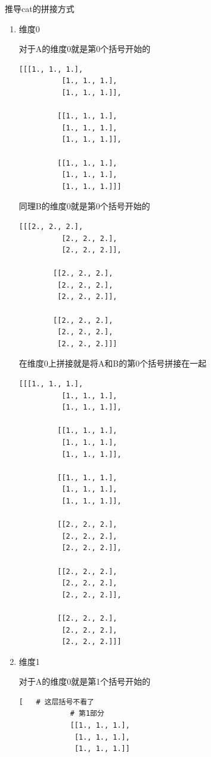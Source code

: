 \begin{derivation}{推导cat的拼接方式}
    \begin{enumerate}[label=\arabic*)]
        \item 维度0 

        对于A的维度0就是第0个括号开始的
        \begin{lstlisting}[style=demostyle,numbers=none]
        [[[1., 1., 1.],
          [1., 1., 1.],
          [1., 1., 1.]],

         [[1., 1., 1.],
          [1., 1., 1.],
          [1., 1., 1.]],

         [[1., 1., 1.],
          [1., 1., 1.],
          [1., 1., 1.]]]
        \end{lstlisting}   
        
        同理B的维度0就是第0个括号开始的
        \begin{lstlisting}[style=demostyle,numbers=none]
        [[[2., 2., 2.],
          [2., 2., 2.],
          [2., 2., 2.]],

        [[2., 2., 2.],
         [2., 2., 2.],
         [2., 2., 2.]],

        [[2., 2., 2.],
         [2., 2., 2.],
         [2., 2., 2.]]]
        \end{lstlisting}

        在维度0上拼接就是将A和B的第0个括号拼接在一起
        \begin{lstlisting}[style=demostyle,numbers=none]
        [[[1., 1., 1.],
          [1., 1., 1.],
          [1., 1., 1.]],

         [[1., 1., 1.],
          [1., 1., 1.],
          [1., 1., 1.]],

         [[1., 1., 1.],
          [1., 1., 1.],
          [1., 1., 1.]],

         [[2., 2., 2.],
          [2., 2., 2.],
          [2., 2., 2.]],

         [[2., 2., 2.],
          [2., 2., 2.],
          [2., 2., 2.]],

         [[2., 2., 2.],
          [2., 2., 2.],
          [2., 2., 2.]]]
        \end{lstlisting}

        \item 维度1

        对于A的维度0就是第1个括号开始的
        \begin{lstlisting}[style=demostyle,numbers=none]
        [   # 这层括号不看了
            # 第1部分
            [[1., 1., 1.],
             [1., 1., 1.],
             [1., 1., 1.]]
            

\end{lstlisting}
\end{enumerate}
\end{derivation}
